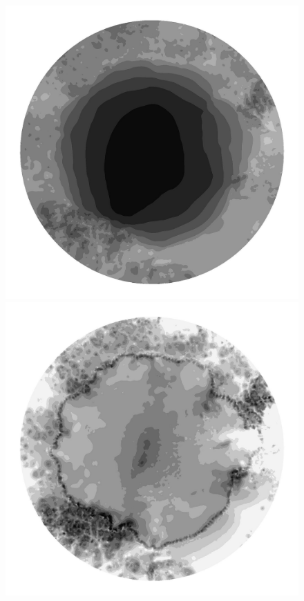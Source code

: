 \begin{figure}
  \begin{minipage}[b]{0.30\linewidth}
    \includegraphics[width=1.0\textwidth]{images/EISMINT_II/Ubar/S_35000.jpg}
  \end{minipage}
  \quad
  \begin{minipage}[b]{0.30\linewidth}
    \includegraphics[width=1.0\textwidth]{images/EISMINT_II/Ubar/beta_35000.jpg}

\end{minipage}
\end{figure}
